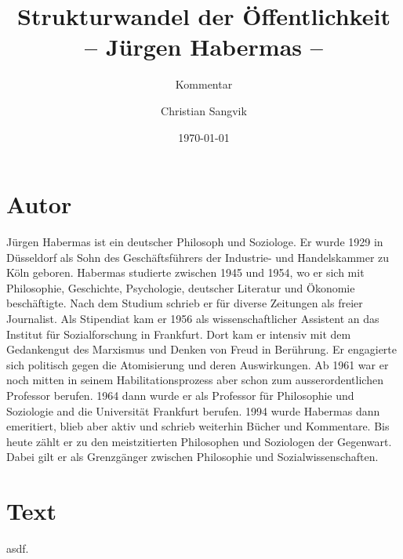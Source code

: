 \documentclass[a4paper,ngerman,11pt]{scrartcl}
\subtitle{Kommentar}
\author{Christian Sangvik}
\date{\today}
\title{Strukturwandel der Öffentlichkeit\\-- Jürgen Habermas --}
\begin{document}
\maketitle

\section{Autor}
\label{sec-1}

Jürgen Habermas ist ein deutscher Philosoph und Soziologe. Er wurde 1929 in
Düsseldorf als Sohn des Geschäftsführers der Industrie- und Handelskammer zu
Köln geboren. Habermas studierte zwischen 1945 und 1954, wo er sich mit
Philosophie, Geschichte, Psychologie, deutscher Literatur und Ökonomie
beschäftigte. Nach dem Studium schrieb er für diverse Zeitungen als freier
Journalist. Als Stipendiat kam er 1956 als wissenschaftlicher Assistent an das
Institut für Sozialforschung in Frankfurt. Dort kam er intensiv mit dem
Gedankengut des Marxismus und Denken von Freud in Berührung. Er engagierte
sich politisch gegen die Atomisierung und deren Auswirkungen. Ab 1961 war er
noch mitten in seinem Habilitationsprozess aber schon zum ausserordentlichen
Professor berufen. 1964 dann wurde er als Professor für Philosophie und
Soziologie and die Universität Frankfurt berufen. 1994 wurde Habermas dann
emeritiert, blieb aber aktiv und schrieb weiterhin Bücher und Kommentare. Bis
heute zählt er zu den meistzitierten Philosophen und Soziologen der
Gegenwart. Dabei gilt er als Grenzgänger zwischen Philosophie und
Sozialwissenschaften.\cite{wiki:Habermas-de}

\section{Text}
\label{sec-2}

asdf.\cite{Habermas1962}



\end{document}
